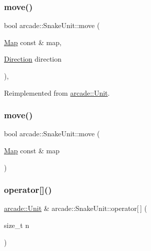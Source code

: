 \subsubsection{\texorpdfstring{move()}{move()}\hspace{0.1cm}{\footnotesize\ttfamily [1/2]}}
{\footnotesize\ttfamily bool arcade\+::\+Snake\+Unit\+::move (\begin{DoxyParamCaption}\item[{\hyperlink{classarcade_1_1_map}{Map} const \&}]{map,  }\item[{\hyperlink{classarcade_1_1_unit_af418afeaba1f7fd5934b6ae1343215dd}{Direction}}]{direction }\end{DoxyParamCaption})\hspace{0.3cm}{\ttfamily [override]}, {\ttfamily [virtual]}}



Reimplemented from \hyperlink{classarcade_1_1_unit_a2a6a6feacea0fce220062be1115207b1}{arcade\+::\+Unit}.

\mbox{\label{classarcade_1_1_snake_unit_a2a0c1cf1880b9c595706dc0b4202e46a}} 
\subsubsection{\texorpdfstring{move()}{move()}\hspace{0.1cm}{\footnotesize\ttfamily [2/2]}}
{\footnotesize\ttfamily bool arcade\+::\+Snake\+Unit\+::move (\begin{DoxyParamCaption}\item[{\hyperlink{classarcade_1_1_map}{Map} const \&}]{map }\end{DoxyParamCaption})}

\mbox{\label{classarcade_1_1_snake_unit_a29fba4415dc5202deb2b543ea9bcafec}} 
\subsubsection{\texorpdfstring{operator[]()}{operator[]()}\hspace{0.1cm}{\footnotesize\ttfamily [1/2]}}
{\footnotesize\ttfamily \hyperlink{classarcade_1_1_unit}{arcade\+::\+Unit} \& arcade\+::\+Snake\+Unit\+::operator\mbox{[}$\,$\mbox{]} (\begin{DoxyParamCaption}\item[{size\+\_\+t}]{n }\end{DoxyParamCaption})}

